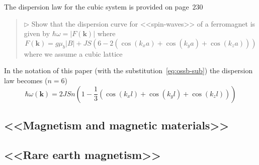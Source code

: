     The dispersion law for the cubic system is provided  on page~$230$
    \begin{quote}
        $\triangleright$ Show that the dispersion curve for <<spin-waves>> of a ferromagnet is given by $\hbar\omega = \vert F(\mathbf{k})\vert$  where
        \begin{equation}
            F(\mathbf{k}) = g\mu_b\vert B \vert + JS\left(6 - 2\left(\cos(k_xa) + \cos(k_ya) + \cos(k_za)\right)\right)
        \end{equation}
        where we assume a cubic lattice
    \end{quote}

    In the notation of this paper (with the substitution~\eqref{eq:ossb-sub}) the dispersion law becomes ($n = 6$)
    \begin{equation}
        \hbar\omega(\mathbf{k}) = 2JSn\left(1 - \dfrac{1}{3}\left(\cos(k_xl) + \cos(k_yl) + \cos(k_zl)\right)\right)
    \end{equation}
\subsection{<<Magnetism and magnetic materials>>\cite{coey2010magnetism}}

\subsection{<<Rare earth magnetism>>\cite{jensen1991rare}}



